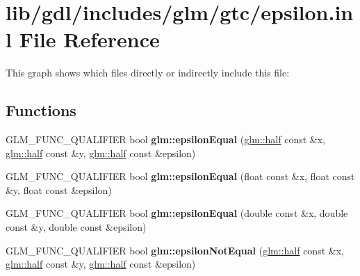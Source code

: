 \hypertarget{epsilon_8inl}{}\section{lib/gdl/includes/glm/gtc/epsilon.inl File Reference}
\label{epsilon_8inl}
This graph shows which files directly or indirectly include this file\+:
\subsection*{Functions}
\begin{DoxyCompactItemize}
\item 
\hypertarget{namespaceglm_ad274b28685a678c8c35a7f05d441b99a}{}G\+L\+M\+\_\+\+F\+U\+N\+C\+\_\+\+Q\+U\+A\+L\+I\+F\+I\+E\+R bool {\bfseries glm\+::epsilon\+Equal} (\hyperlink{group__gtc__half__float_gadae4de950aa2230455634615b782c151}{glm\+::half} const \&x, \hyperlink{group__gtc__half__float_gadae4de950aa2230455634615b782c151}{glm\+::half} const \&y, \hyperlink{group__gtc__half__float_gadae4de950aa2230455634615b782c151}{glm\+::half} const \&epsilon)\label{namespaceglm_ad274b28685a678c8c35a7f05d441b99a}

\item 
\hypertarget{namespaceglm_a36ee9e191ca38883c7341ed5e4265f23}{}G\+L\+M\+\_\+\+F\+U\+N\+C\+\_\+\+Q\+U\+A\+L\+I\+F\+I\+E\+R bool {\bfseries glm\+::epsilon\+Equal} (float const \&x, float const \&y, float const \&epsilon)\label{namespaceglm_a36ee9e191ca38883c7341ed5e4265f23}

\item 
\hypertarget{namespaceglm_a26a3437bb1eab4cf96a6ce4d299c88f3}{}G\+L\+M\+\_\+\+F\+U\+N\+C\+\_\+\+Q\+U\+A\+L\+I\+F\+I\+E\+R bool {\bfseries glm\+::epsilon\+Equal} (double const \&x, double const \&y, double const \&epsilon)\label{namespaceglm_a26a3437bb1eab4cf96a6ce4d299c88f3}

\item 
\hypertarget{namespaceglm_a3b4f1ae0a0d68c1d65169509b89ac828}{}G\+L\+M\+\_\+\+F\+U\+N\+C\+\_\+\+Q\+U\+A\+L\+I\+F\+I\+E\+R bool {\bfseries glm\+::epsilon\+Not\+Equal} (\hyperlink{group__gtc__half__float_gadae4de950aa2230455634615b782c151}{glm\+::half} const \&x, \hyperlink{group__gtc__half__float_gadae4de950aa2230455634615b782c151}{glm\+::half} const \&y, \hyperlink{group__gtc__half__float_gadae4de950aa2230455634615b782c151}{glm\+::half} const \&epsilon)\label{namespaceglm_a3b4f1ae0a0d68c1d65169509b89ac828}


\end{DoxyCompactItemize}
